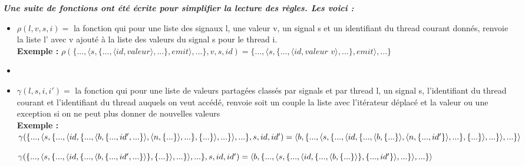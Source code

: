 \documentclass[10pt,a4paper]{article}
\begin{document}
			
				\textbf{\textit{Une suite de fonctions ont été écrite pour simplifier la lecture des règles. Les voici :}}
				\smallbreak
				\begin{itemize}
					\item[] $\rho(l,v,s,i) =$ la fonction qui pour une liste des signaux l, une valeur v, un signal s et un identifiant du thread courant donnés, renvoie la liste l' avec v ajouté à la liste des valeurs du signal s pour le thread i.
					\\\textbf{Exemple :} $\rho(\{...,\langle s,\{...,\langle id,valeur\rangle,...\},emit\rangle,...\},v,s,id) = \{...,\langle s,\{...,\langle id,valeur$ $v\rangle,...\},emit\rangle,...\}$
					\item[] 
					\item[] $\gamma(l,s,i,i') =$ la fonction qui pour une liste de valeurs partagées classés par signals et par thread l, un signal s, l'identifiant du thread courant et l'identifiant du thread auquels on veut accédé, renvoie soit un couple la liste avec l'itérateur déplacé et la valeur ou une exception si on ne peut plus donner de nouvelles valeurs 
					\\\textbf{Exemple :}
					\\$\gamma(\{...,\langle s,\{...,\langle id,\{...,\langle b,\{...,id',...\}\rangle,\langle n,\{...\}\rangle,...\},\{...\}\rangle,...\}\rangle,...\},s,id,id') = 
					\\\langle b , \{...,\langle s,\{...,\langle id,\{...,\langle b,\{...\}\rangle,\langle n,\{...,id'\}\rangle,...\},\{...\}\rangle,...\}\rangle,...\} \rangle$
					\medbreak
					
					$\gamma(\{...,\langle s,\{...,\langle id,\{...,\langle b,\{...,id',...\}\rangle\},\{...\}\rangle,...\}\rangle,...\},s,id,id') = 
					\\\langle b , \{...,\langle s,\{...,\langle id,\{...,\langle b,\{...\}\rangle\},\{...,id'\}\rangle,...\}\rangle,...\} \rangle$
					\medbreak
					

\end{itemize}
\end{document}
